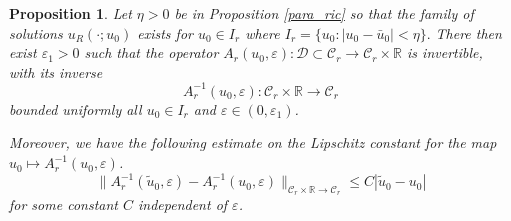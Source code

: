 \documentclass[letterpaper,11pt]{article}
\newcommand{\eps}{\varepsilon}
\numberwithin{equation}{section}
\theoremstyle{plain}
\newtheorem{Proposition}[Lemma]{Proposition}
\begin{document}
\begin{Proposition}\label{inv_A_r}Let $\eta>0$ be in Proposition \ref{para_ric} so that the family of solutions $u_R(\cdot;u_0)$ exists for $u_0 \in I_r$ where $I_r = \{ u_0: |u_0-\bar{u}_0|<\eta\}.$ There then exist $\eps_1>0$ such that the operator $A_r(u_0,\eps) : \mathcal{D}\subset \mathcal{C}_r \to \mathcal{C}_r\times \mathbb{R}$ is invertible, with its inverse 
\[
A_r^{-1}(u_0,\eps) : \mathcal{C}_r \times \mathbb{R} \to \mathcal{C}_r
\]
bounded uniformly all $u_0\in I_r$ and $\eps \in (0,\eps_1)$.

Moreover, we have the following estimate on the Lipschitz constant for the map $u_0 \mapsto A_r^{-1}(u_0,\eps)$.
\begin{equation}\label{Lip:Ar_inv}
\|A_r^{-1}(\tilde{u}_0,\eps) - A_r^{-1}(u_0,\eps)\|_{\mathcal{C}_r\times\mathbb{R}\to \mathcal{C}_r} \le C|\tilde{u}_0-u_0|
\end{equation}
for some constant $C$ independent of $\eps$.
\end{Proposition}
\end{document}
